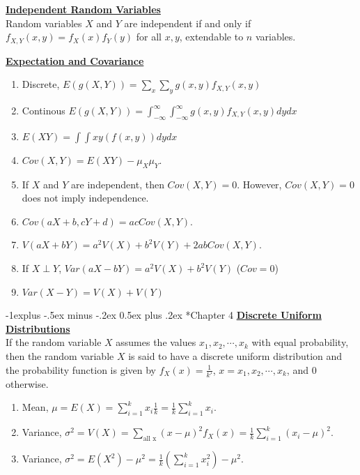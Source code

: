 \documentclass[10pt,landscape]{article}
\makeatletter
\renewcommand{\subsection}{\@startsection{subsection}{2}{0mm}%
                                {-1explus -.5ex minus -.2ex}%
                                {0.5ex plus .2ex}%
                                {\normalfont\normalsize\bfseries}}
\makeatother
\begin{document}
\begin{multicols*}{3}
\textbf{\underline{Independent Random Variables}} \\
Random variables $X$ and $Y$ are independent if and only if $f_{X,Y}(x,y)=f_X(x)f_Y(y)$ for all $x,y$, extendable to $n$ variables.

\textbf{\underline{Expectation and Covariance}} \\
\begin{multicols*}{2}
    \begin{enumerate}[topsep=0pt,noitemsep,wide=0pt, leftmargin=\dimexpr\labelwidth + 2\labelsep\relax]
        \item Discrete, $E(g(X,Y)) = \sum_{x}\sum_{y}g(x,y)f_{X,Y}(x,y)$
        \item Continous $E(g(X,Y)) = \int_{-\infty}^{\infty}\int_{-\infty}^{\infty}g(x,y)f_{X,Y}(x,y)dydx$
        \item $E(XY)=\int\int xy(f(x,y))dydx$
        \item $Cov(X,Y)=E(XY)-\mu_X\mu_Y$.
        \item If $X$ and $Y$ are independent, then $Cov(X,Y)=0$. However, $Cov(X,Y)=0$ does not imply independence.
        \item $Cov(aX+b,cY+d)=acCov(X,Y)$.
        \item $V(aX+bY)=a^2V(X)+b^2V(Y)+2abCov(X,Y)$.
        \item If $X \perp Y$, $Var(aX-bY)=a^2V(X)+b^2V(Y)$ ($Cov = 0$)
        \item $Var(X-Y) = V(X) + V(Y)$ 
    \end{enumerate}
\end{multicols*}

\subsection*{Chapter 4}
\textbf{\underline{Discrete Uniform Distributions}} \\
If the random variable $X$ assumes the values $x_1,x_2,\cdots,x_k$ with equal probability, then the random variable $X$ is said to have a discrete uniform distribution and the probability function is given by $f_X(x)=\frac{1}{k'}$, $x=x_1,x_2,\cdots, x_k$, and 0 otherwise.
\begin{enumerate}[topsep=0pt,noitemsep,wide=0pt, leftmargin=\dimexpr\labelwidth + 2\labelsep\relax]
    \item Mean, $\mu=E(X)=\sum_{i=1}^kx_i\frac{1}{k}=\frac{1}{k}\sum_{i=1}^kx_i$.
    \item Variance, $\sigma^2=V(X)=\sum_{\text{all x}}(x-\mu)^2f_X(x)=\frac{1}{k}\sum_{i=1}^k(x_i-\mu)^2$.
    \item Variance, $\sigma^2=E(X^2)-\mu^2=\frac{1}{k}(\sum_{i=1}^kx_i^2)-\mu^2$.
\end{enumerate}


\end{multicols*}
\end{document}
